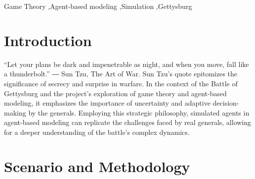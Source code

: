 \documentclass[final,5p,times,twocolumn,authoryear]{elsarticle}
\begin{document}
\begin{frontmatter}
\begin{abstract}
\end{abstract}



\begin{keyword}
Game Theory \sep Agent-based modeling \sep Simulation \sep Gettysburg



\end{keyword}


\end{frontmatter}




\section{Introduction}
\label{introduction}

“Let your plans be dark and impenetrable as night, and when you move, fall like a thunderbolt.”
― Sun Tzu, The Art of War. Sun Tzu's quote epitomizes the significance of secrecy and surprise in warfare. In the context of the Battle of Gettysburg and the project's exploration of game theory and agent-based modeling, it emphasizes the importance of uncertainty and adaptive decision-making by the generals. Employing this strategic philosophy, simulated agents in agent-based modeling can replicate the challenges faced by real generals, allowing for a deeper understanding of the battle's complex dynamics.

\section{Scenario and Methodology}
\end{document}
